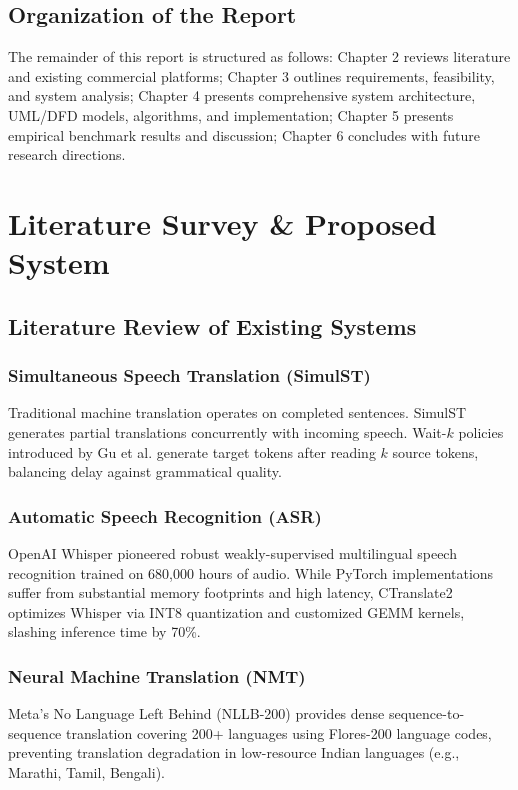 \documentclass[12pt,a4paper]{report}
\begin{document}
\section{Organization of the Report}
The remainder of this report is structured as follows: Chapter 2 reviews literature and existing commercial platforms; Chapter 3 outlines requirements, feasibility, and system analysis; Chapter 4 presents comprehensive system architecture, UML/DFD models, algorithms, and implementation; Chapter 5 presents empirical benchmark results and discussion; Chapter 6 concludes with future research directions.

\chapter{Literature Survey \& Proposed System}

\section{Literature Review of Existing Systems}
\subsection{Simultaneous Speech Translation (SimulST)}
Traditional machine translation operates on completed sentences. SimulST generates partial translations concurrently with incoming speech. Wait-$k$ policies introduced by Gu et al. generate target tokens after reading $k$ source tokens, balancing delay against grammatical quality.

\subsection{Automatic Speech Recognition (ASR)}
OpenAI Whisper pioneered robust weakly-supervised multilingual speech recognition trained on 680,000 hours of audio. While PyTorch implementations suffer from substantial memory footprints and high latency, CTranslate2 optimizes Whisper via INT8 quantization and customized GEMM kernels, slashing inference time by 70\%.

\subsection{Neural Machine Translation (NMT)}
Meta's No Language Left Behind (NLLB-200) provides dense sequence-to-sequence translation covering 200+ languages using Flores-200 language codes, preventing translation degradation in low-resource Indian languages (e.g., Marathi, Tamil, Bengali).
\end{document}
